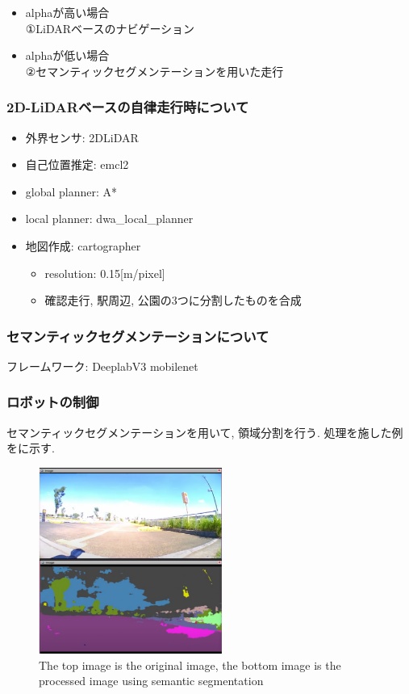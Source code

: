 \documentclass[uplatex, twocolumn, 9pt]{jsproceedings}
\begin{document}
\newpage

\begin{itemize}
  \item alphaが高い場合\\
  ①LiDARベースのナビゲーション
  \item alphaが低い場合\\
  ②セマンティックセグメンテーションを用いた走行
\end{itemize}

\subsubsection{2D-LiDARベースの自律走行時について}

\begin{itemize}
  \item 外界センサ: 2DLiDAR
  \item 自己位置推定: emcl2
  \item global planner: A*
  \item local planner: dwa\_local\_planner
  \item 地図作成: cartographer
  \begin{itemize}
    \item resolution: 0.15[m/pixel]
    \item 確認走行, 駅周辺, 公園の3つに分割したものを合成
  \end{itemize}
\end{itemize}

\subsubsection{セマンティックセグメンテーションについて}
フレームワーク: DeeplabV3 mobilenet
\subsubsection{ロボットの制御}
セマンティックセグメンテーションを用いて, 領域分割を行う. 処理を施した例をに示す.

\begin{figure}[h]
  \centering
  \includegraphics[width=60mm]{fig/camera_for_seg.pdf}
  \caption{The top image is the original image, the bottom image is the processed image using semantic segmentation}
  \label{fig:for_seg}%
\end{figure}
\end{document}
